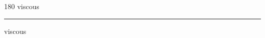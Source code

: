 
\begin{frame}
\begin{center}
\begin{turn}{180}
{\fontsize{2.5cm}{1em}\selectfont viscous}
\end{turn}
\vspace{1em}\par  
\hrule
\vspace{1em}\par  
{\fontsize{2.5cm}{1em}\selectfont viscous}
\end{center}
\end{frame}

